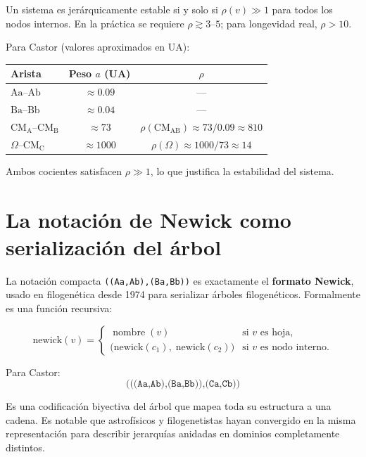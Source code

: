 \documentclass[a4paper]{article}
\begin{document}
Un sistema es jerárquicamente estable si y solo si
$\rho(v) \gg 1$ para todos los nodos internos. En la práctica se
requiere $\rho \gtrsim 3\text{--}5$; para longevidad real, $\rho > 10$.

Para Castor (valores aproximados en UA):

\begin{center}
\begin{tabular}{lcc}
\toprule
Arista & Peso $a$ (UA) & $\rho$ \\
\midrule
$\mathrm{Aa}\text{--}\mathrm{Ab}$ & $\approx 0.09$ & --- \\
$\mathrm{Ba}\text{--}\mathrm{Bb}$ & $\approx 0.04$ & --- \\
$\mathrm{CM_A}\text{--}\mathrm{CM_B}$ & $\approx 73$
  & $\rho(\mathrm{CM_{AB}}) \approx 73/0.09 \approx 810$ \\
$\Omega\text{--}\mathrm{CM_C}$ & $\approx 1000$
  & $\rho(\Omega) \approx 1000/73 \approx 14$ \\
\bottomrule
\end{tabular}
\end{center}

Ambos cocientes satisfacen $\rho \gg 1$, lo que justifica la
estabilidad del sistema.

\section{La notación de Newick como serialización del árbol}

La notación compacta \texttt{((Aa,Ab),(Ba,Bb))} es exactamente el
\textbf{formato Newick}, usado en filogenética desde 1974 para
serializar árboles filogenéticos. Formalmente es una función
recursiva:

$$\mathrm{newick}(v) =
\begin{cases}
  \operatorname{nombre}(v)
    & \text{si } v \text{ es hoja,}\\[4pt]
  \bigl(\mathrm{newick}(c_1),\;\mathrm{newick}(c_2)\bigr)
    & \text{si } v \text{ es nodo interno.}
\end{cases}$$

Para Castor:
$$\texttt{(((Aa,Ab),(Ba,Bb)),(Ca,Cb))}$$

Es una codificación biyectiva del árbol que mapea toda su
estructura a una cadena. Es notable que astrofísicos y filogenetistas
hayan convergido en la misma representación para describir
jerarquías anidadas en dominios completamente distintos.
\end{document}
